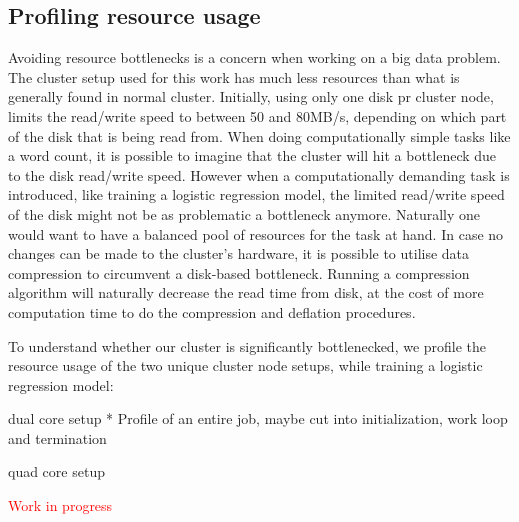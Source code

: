 \subsection{Profiling resource usage}\label{sec:profile}

Avoiding resource bottlenecks is a concern when working on a big data problem. 
The cluster setup used for this work has much less resources than what is generally found in normal cluster. 
Initially, using only one disk pr cluster node, limits the read/write speed to between 50 and 80MB/s, depending on which part of the disk that is being read from. 
When doing computationally simple tasks like a word count, it is possible to imagine that the cluster will hit a bottleneck due to the disk read/write speed. 
However when a computationally demanding task is introduced, like training a logistic regression model, the limited read/write speed of the disk might not be as problematic a bottleneck anymore. %
Naturally one would want to have a balanced pool of resources for the task at hand. 
In case no changes can be made to the cluster's hardware, it is possible to utilise data compression to circumvent a disk-based bottleneck. 
Running a compression algorithm will naturally decrease the read time from disk, at the cost of more computation time to do the compression and deflation procedures.

To understand whether our cluster is significantly bottlenecked, we profile the resource usage of the two unique cluster node setups, while training a logistic regression model:

dual core setup
* Profile of an entire job, maybe cut into initialization, work loop and termination

quad core setup

\textcolor{red}{Work in progress}